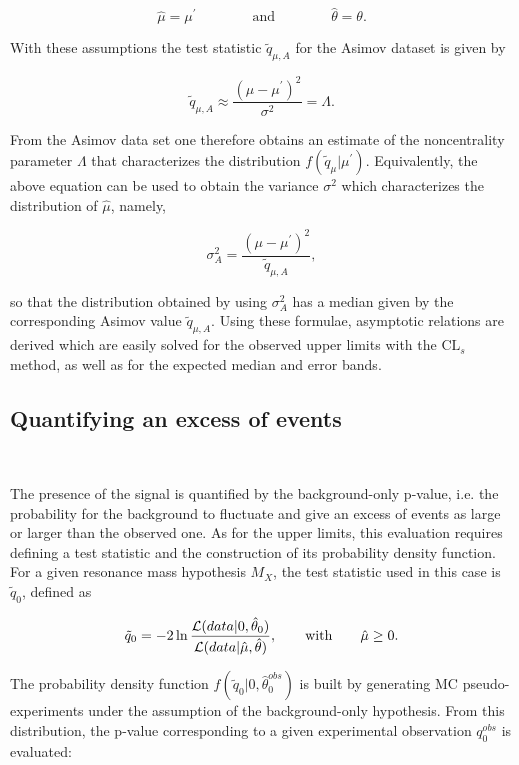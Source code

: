 \begin{equation}
\hat{\mu} = \mu^\prime \qquad\qquad \mathrm{and} \qquad\qquad \hat{\theta} = \theta.
\end{equation}

With these assumptions the test statistic $\tilde{q}_{\mu,A}$ for the Asimov dataset is given by 

\begin{equation}
\tilde{q}_{\mu,A} \approx \frac{(\mu-\mu^\prime)^2}{\sigma^2} = \Lambda.
\end{equation}

From the Asimov data set one therefore obtains an estimate of the noncentrality parameter $\Lambda$ that characterizes the distribution $f(\tilde{q}_\mu|\mu^\prime)$.
Equivalently, the above equation can be used to obtain the variance $\sigma^2$ which characterizes the distribution of $\hat{\mu}$, namely,

\begin{equation}
\sigma_A^2 = \frac{(\mu-\mu^\prime)^2}{\tilde{q}_{\mu,A}},
\end{equation}

so that the distribution obtained by using $\sigma_A^2$ has a median given by the corresponding Asimov value $\tilde{q}_{\mu,A}$. 
Using these formulae, asymptotic relations are derived which are easily solved for the observed upper limits with the $\mathrm{CL}_s$ method,
as well as for the expected median and error bands.

\subsection{Quantifying an excess of events}~\label{subsec:pvalue}

The presence of the signal is quantified by the background-only p-value, i.e. the probability for the background to fluctuate
and give an excess of events as large or larger than the observed one.
As for the upper limits, this evaluation requires defining a test statistic and the construction of its probability density function.
For a given resonance mass hypothesis $M_X$, the test statistic used in this case is $\tilde{q}_0$, defined as

\begin{equation}
\tilde{q}_0 = -2\ln\frac{{\cal L}(data | 0,\hat{\theta}_0)}{{\cal L}( data | \hat{\mu},\hat{\theta})},\qquad \mathrm{with} \qquad \hat{\mu} \geq 0.
\end{equation}

The probability density function $f(\tilde{q}_0|0,\hat{\theta}_0^{obs})$ is built by generating MC pseudo-experiments under the assumption of the background-only hypothesis.
From this distribution, the p-value corresponding to a given experimental observation $q_0^{obs}$ is evaluated:

